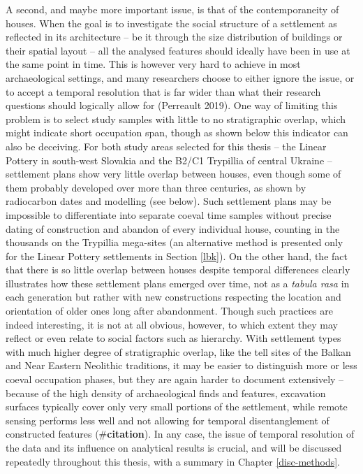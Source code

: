 \documentclass[
  12pt,
  a4paper, twoside]{book}
\begin{document}
A second, and maybe more important issue, is that of the contemporaneity of houses. When the goal is to investigate the social structure of a settlement as reflected in its architecture -- be it through the size distribution of buildings or their spatial layout -- all the analysed features should ideally have been in use at the same point in time. This is however very hard to achieve in most archaeological settings, and many researchers choose to either ignore the issue, or to accept a temporal resolution that is far wider than what their research questions should logically allow for (Perreault 2019). One way of limiting this problem is to select study samples with little to no stratigraphic overlap, which might indicate short occupation span, though as shown below this indicator can also be deceiving. For both study areas selected for this thesis -- the Linear Pottery in south-west Slovakia and the B2/C1 Trypillia of central Ukraine -- settlement plans show very little overlap between houses, even though some of them probably developed over more than three centuries, as shown by radiocarbon dates and modelling (see below). Such settlement plans may be impossible to differentiate into separate coeval time samples without precise dating of construction and abandon of every individual house, counting in the thousands on the Trypillia mega-sites (an alternative method is presented only for the Linear Pottery settlements in Section \ref{lbk}). On the other hand, the fact that there is so little overlap between houses despite temporal differences clearly illustrates how these settlement plans emerged over time, not as a \emph{tabula rasa} in each generation but rather with new constructions respecting the location and orientation of older ones long after abandonment. Though such practices are indeed interesting, it is not at all obvious, however, to which extent they may reflect or even relate to social factors such as hierarchy. With settlement types with much higher degree of stratigraphic overlap, like the tell sites of the Balkan and Near Eastern Neolithic traditions, it may be easier to distinguish more or less coeval occupation phases, but they are again harder to document extensively -- because of the high density of archaeological finds and features, excavation surfaces typically cover only very small portions of the settlement, while remote sensing performs less well and not allowing for temporal disentanglement of constructed features (\#\textbf{citation}). In any case, the issue of temporal resolution of the data and its influence on analytical results is crucial, and will be discussed repeatedly throughout this thesis, with a summary in Chapter \ref{disc-methods}.
\end{document}
